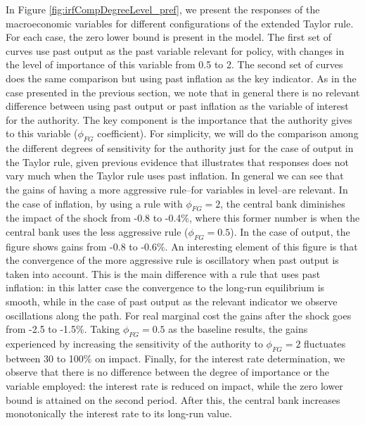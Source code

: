 \documentclass[11pt]{article}
\numberwithin{equation}{section}
\begin{document}
In Figure \ref{fig:irfCompDegreeLevel_pref}, we present the responses of the macroeconomic variables for different configurations of the extended Taylor rule. For each case, the zero lower bound is present in the model. The first set of curves use past output as the past variable relevant for policy, with changes in the level of importance of this variable from 0.5 to 2. The second set of curves does the same comparison but using past inflation as the key indicator. As in the case presented in the previous section, we note that in general there is no relevant difference between using past output or past inflation as the variable of interest for the authority. The key component is the importance that the authority gives to this variable ($\phi_{FG}$ coefficient). For simplicity, we will do the comparison among the different degrees of sensitivity for the authority just for the case of output in the Taylor rule, given previous evidence that illustrates that responses does not vary much when the Taylor rule uses past inflation. In general we can see that the gains of having a more aggressive rule--for variables in level--are relevant. In the case of inflation, by using a rule with $\phi_{FG}=2$, the central bank diminishes the impact of the shock from -0.8 to -0.4\%, where this former number is when the central bank uses the less aggressive rule ($\phi_{FG}=0.5$). In the case of output, the figure shows gains from -0.8 to -0.6\%. An interesting element of this figure is that the convergence of the more aggressive rule is oscillatory when past output is taken into account. This is the main difference with a rule that uses past inflation: in this latter case the convergence to the long-run equilibrium is smooth, while in the case of past output as the relevant indicator we observe oscillations along the path. For real marginal cost the gains after the shock goes from -2.5 to -1.5\%. Taking $\phi_{FG}=0.5$ as the baseline results, the gains experienced by increasing the sensitivity of the authority to $\phi_{FG}=2$ fluctuates between 30 to 100\% on impact. Finally, for the interest rate determination, we observe that there is no difference between the degree of importance or the variable employed: the interest rate is reduced on impact, while the zero lower bound is attained on the second period. After this, the central bank increases monotonically the interest rate to its long-run value. 
\end{document}
